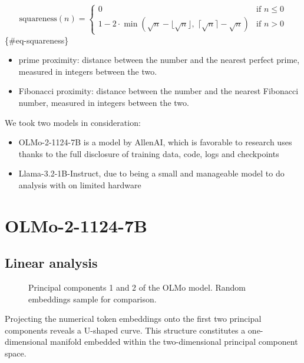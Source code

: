 \documentclass[
  a4paper, twoside, 10pt, titlepage]{book}
\makeatletter
\newcommand*\pandocbounded[1]{%
  \sbox\pandoc@box{#1}%
  \Gscale@div\@tempa{\textheight}{\dimexpr\ht\pandoc@box+\dp\pandoc@box\relax}%
  \Gscale@div\@tempb{\linewidth}{\wd\pandoc@box}%
  \ifdim\@tempb\p@<\@tempa\p@\let\@tempa\@tempb\fi%
  \ifdim\@tempa\p@<\p@\scalebox{\@tempa}{\usebox\pandoc@box}%
  \else\usebox{\pandoc@box}%
  \fi%
}
\makeatother
\begin{document}
\[ \text{squareness}(n) =\begin{cases} 0 & \text{if } n \leq 0 \\ 1 - 2 \cdot
\min\left( \sqrt{n} - \lfloor \sqrt{n} \rfloor,\; \lceil \sqrt{n} \rceil -
\sqrt{n} \right) & \text{if } n > 0 \end{cases} \] \{\#eq-squareness\}

\begin{itemize}
\item
  prime proximity: distance between the number and the nearest perfect
  prime, measured in integers between the two.
\item
  Fibonacci proximity: distance between the number and the nearest
  Fibonacci number, measured in integers between the two.
\end{itemize}

We took two models in consideration:

\begin{itemize}
\item
  OLMo-2-1124-7B is a model by AllenAI, which is favorable to research
  uses thanks to the full disclosure of training data, code, logs and
  checkpoints
\item
  Llama-3.2-1B-Instruct, due to being a small and manageable model to do
  analysis with on limited hardware
\end{itemize}

\section{OLMo-2-1124-7B}\label{olmo-2-1124-7b}

\subsection{Linear analysis}\label{linear-analysis}

\begin{figure}
\centering
\pandocbounded{}
\caption{Principal components 1 and 2 of the OLMo model. Random
embeddings sample for comparison.}\label{fig-olmo-pca}
\end{figure}

Projecting the numerical token embeddings onto the first two principal
components reveals a U-shaped curve. This structure constitutes a
one-dimensional manifold embedded within the two-dimensional principal
component space.
\end{document}
